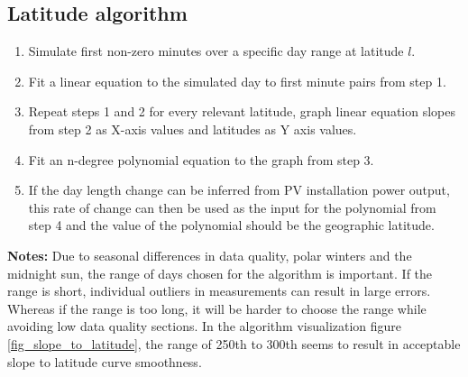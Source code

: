 \subsection{Latitude algorithm}
\begin{enumerate}
  \item Simulate first non-zero minutes over a specific day range at latitude $l$.
  
  \item Fit a linear equation to the simulated day to first minute pairs from step 1.
  
  \item Repeat steps 1 and 2 for every relevant latitude, graph linear equation slopes from step 2 as X-axis values and latitudes as Y axis values.
 
  \item Fit an n-degree polynomial equation to the graph from step 3.
  
  \item If the day length change can be inferred from PV installation power output, this rate of change can then be used as the input for the polynomial from step 4 and the value of the polynomial should be the geographic latitude.
\end{enumerate}

\noindent
\textbf{Notes:}
Due to seasonal differences in data quality, polar winters and the midnight sun, the range of days chosen for the algorithm is important. If the range is short, individual outliers in measurements can result in large errors. Whereas if the range is too long, it will be harder to choose the range while avoiding low data quality sections. In the algorithm visualization figure \ref{fig_slope_to_latitude}, the range of 250th to 300th seems to result in acceptable slope to latitude curve smoothness.
\newpage
